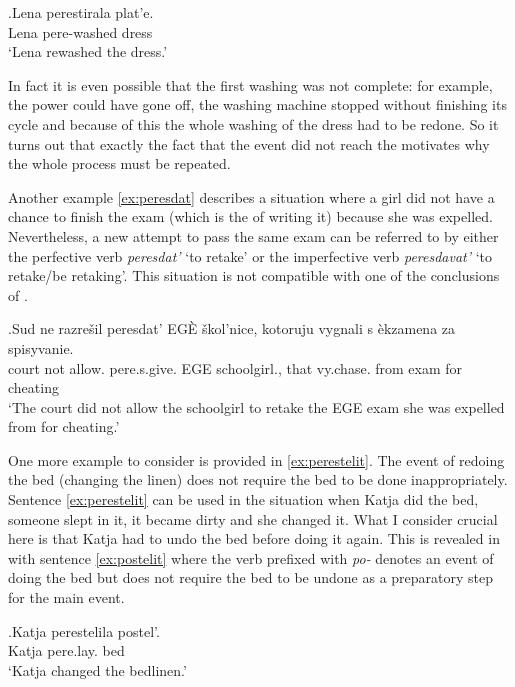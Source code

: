 \exg.\label{ex:perestirat}Lena perestirala plat'e.\\
Lena pere-washed dress\\
\trans `Lena rewashed the dress.'

In fact it is even possible that the first washing was not complete: for example, the power could have gone off, the washing machine stopped without finishing its cycle and because of this the whole washing of the dress had to be redone. So it turns out that exactly the fact that the event did not reach the  motivates why the whole process must be repeated.

Another example \ref{ex:peresdat} describes a situation where a girl did not have a chance to finish the exam (which is the  of writing it) because she was expelled. Nevertheless, a new attempt to pass the same exam can be referred to by either the perfective verb \textit{peresdat'} `to retake' or the imperfective verb \textit{peresdavat'} `to retake/be retaking'. This situation is not compatible with one of the conclusions of \citet{Kagan:book}.

\exg.\label{ex:peresdat}Sud ne razre\v{s}il peresdat' EG\`{E} \v{s}kol'nice, kotoruju vygnali s \`{e}kzamena za spisyvanie.\\
court not allow. pere.s.give. EGE schoolgirl., that vy.chase. from exam for cheating\\
\trans `The court did not allow the schoolgirl to retake the EGE exam she was expelled from for cheating.'

One more example to consider is provided in \ref{ex:perestelit}. The event of redoing the bed (changing the linen) does not require the bed to be done inappropriately. Sentence \ref{ex:perestelit} can be used in the situation when Katja did the bed, someone slept in it, it became dirty and she changed it. What I consider crucial here is that Katja had to undo the bed before doing it again. This is revealed in  with sentence \ref{ex:postelit} where the verb prefixed with \textit{po-} denotes an event of doing the bed but does not require the bed to be undone as a preparatory step for the main event. 

\exg.\label{ex:perestelit}Katja perestelila postel'.\\
Katja pere.lay. bed\\
\trans `Katja changed the bedlinen.'


